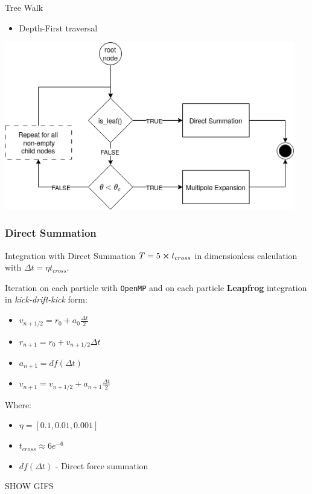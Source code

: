 \begin{frame}{Tree Walk}
	\begin{itemize}
		\item Depth-First traversal
	\end{itemize}
	\includegraphics[width=0.95\textwidth]{figures/multipole_uml.png}
\end{frame}

\subsubsection{Direct Summation}
\begin{frame}{Integration with Direct Summation}
	$T = 5 \cross t_{cross}$ in dimensionless calculation with $\Delta t = \eta t_{cross}$. \bigskip

	Iteration on each particle with \texttt{OpenMP} and on each particle \textbf{Leapfrog} integration in \textit{kick-drift-kick} form:
	\begin{itemize}
		\item $v_{n+1/2} = r_0 + a_0  \frac{\Delta t}{2}$
		\item $r_{n+1} = r_0 + v_{n+1/2} \Delta t$
		\item $a_{n+1} = df(\Delta t)$
		\item $v_{n+1} = v_{n+1/2} + a_{n+1} \frac{\Delta t}{2}$
	\end{itemize} \bigskip

	{\footnotesize Where:
		\begin{itemize}
			\item $\eta = [0.1, 0.01, 0.001]$
			\item $t_{cross} \approx 6e^{-6}$
			\item $df(\Delta t)$ - Direct force summation
		\end{itemize}
	}

	\bigskip\centering
	SHOW GIFS

\end{frame}

